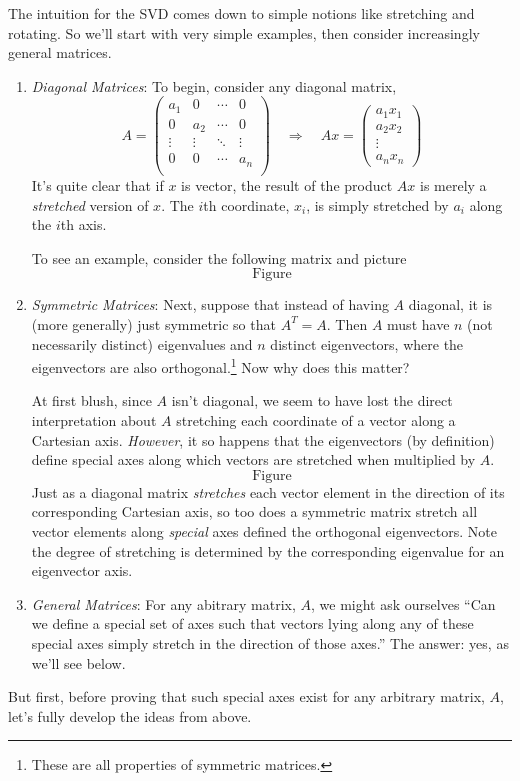 \documentclass[12pt]{article}
\begin{document}
The intuition for the SVD comes down to simple notions like stretching and rotating. So we'll start with very simple examples, then consider increasingly general matrices.
\begin{enumerate}
\item {\sl Diagonal Matrices}: To begin, consider any diagonal matrix,
\[
    A =
    \begin{pmatrix}
        a_1 & 0 & \cdots & 0 \\
        0 & a_2 & \cdots & 0 \\
        \vdots & \vdots & \ddots & \vdots \\
        0 & 0 & \cdots & a_n \\
    \end{pmatrix}
    \quad
    \Rightarrow
    \quad
    Ax = \begin{pmatrix} a_1 x_1 \\ a_2 x_2 \\ \vdots \\
        a_n x_n \end{pmatrix}
\]
It's quite clear that if $x$ is vector, the result of the product $Ax$ is merely a \emph{stretched} version of $x$. The $i$th coordinate, $x_i$, is simply stretched by $a_i$ along the $i$th axis.

To see an example, consider the following matrix and picture
\[ \text{Figure} \]

\item {\sl Symmetric Matrices}: Next, suppose that instead of having $A$ diagonal, it is (more generally) just symmetric so that $A^T = A$. Then $A$ must have $n$ (not necessarily distinct) eigenvalues and $n$ distinct eigenvectors, where the eigenvectors are also orthogonal.\footnote{These are all properties of symmetric matrices.} Now why does this matter?

At first blush, since $A$ isn't diagonal, we seem to have lost the direct interpretation about $A$ stretching each coordinate of a vector along a Cartesian axis. \emph{However}, it so happens that the eigenvectors (by definition) define special axes along which vectors are stretched when multiplied by $A$.
\[ \text{Figure} \]
Just as a diagonal matrix \emph{stretches} each vector element in the direction of its corresponding Cartesian axis, so too does a symmetric matrix stretch all vector elements along \emph{special} axes defined the orthogonal eigenvectors. Note the degree of stretching is determined by the corresponding eigenvalue for an eigenvector axis.

\item {\sl General Matrices}: For any abitrary matrix, $A$, we might ask ourselves ``Can we define a special set of axes such that vectors lying along any of these special axes simply stretch in the direction of those axes.'' The answer: yes, as we'll see below.


\end{enumerate}
But first, before proving that such special axes exist for any arbitrary
matrix, $A$, let's fully develop the ideas from above.
\end{document}
